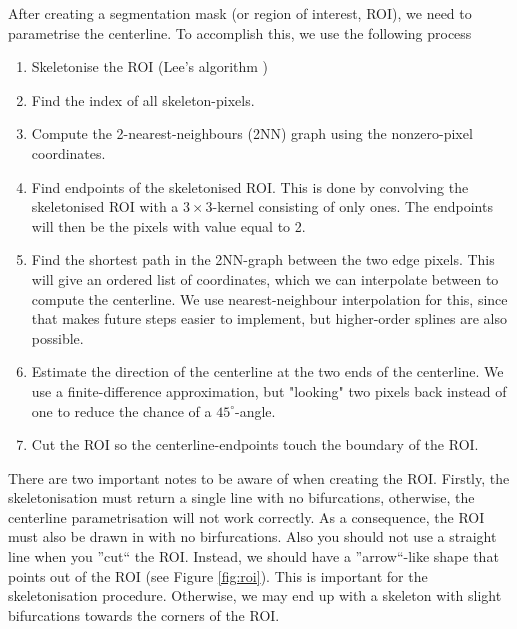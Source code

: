 \documentclass{article}
\begin{document}
After creating a segmentation mask (or region of interest, ROI), we need to parametrise the centerline. To accomplish this, we use the following process

\begin{enumerate}
    \item Skeletonise the ROI (Lee's algorithm \cite{lee1994building})
    \item Find the index of all skeleton-pixels.
    \item Compute the 2-nearest-neighbours (2NN) graph using the nonzero-pixel coordinates. 
    \item Find endpoints of the skeletonised ROI. This is done by convolving the skeletonised ROI with a $3\times3$-kernel consisting of only ones. The endpoints will then be the pixels with value equal to 2.
    \item Find the shortest path in the 2NN-graph between the two edge pixels. This will give an ordered list of coordinates, which we can interpolate between to compute the centerline. We use nearest-neighbour interpolation for this, since that makes future steps easier to implement, but higher-order splines are also possible.
    \item Estimate the direction of the centerline at the two ends of the centerline. We use a finite-difference approximation, but "looking" two pixels back instead of one to reduce the chance of a $45^\circ$-angle.
    \item Cut the ROI so the centerline-endpoints touch the boundary of the ROI.
\end{enumerate}

There are two important notes to be aware of when creating the ROI. Firstly, the skeletonisation must return a single line with no bifurcations, otherwise, the centerline parametrisation will not work correctly. As a consequence, the ROI must also be drawn in with no birfurcations. Also you should not use a straight line when you ''cut`` the ROI. Instead, we should have a ''arrow``-like shape that points out of the ROI (see Figure \ref{fig:roi}). This is important for the skeletonisation procedure. Otherwise, we may end up with a skeleton with slight bifurcations towards the corners of the ROI.
\end{document}
